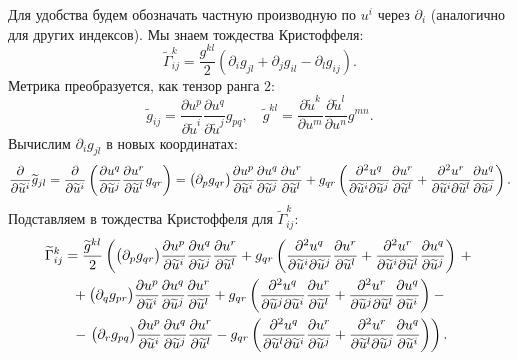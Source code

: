 \begin{solution}
	Для удобства будем обозначать частную производную по $u^i$ через $\partial_i$ (аналогично для других индексов). Мы знаем тождества Кристоффеля:
	\[
		\widetilde{\Gamma}_{ij}^k = \frac{g^{kl}}{2}(\partial_ig_{jl} + \partial_jg_{il} - \partial_lg_{ij}).
	\]
	Метрика преобразуется, как тензор ранга $2$:
	\[
		\widetilde{g}_{ij} = \frac{\partial u^p}{\partial \widetilde{u}^i}\frac{\partial u^q}{\partial \widetilde{u}^j}g_{pq},\quad \widetilde{g}^{kl} = \frac{\partial \widetilde{u}^k}{\partial u^m}\frac{\partial \widetilde{u}^l}{\partial u^n}g^{mn}.
	\]
	Вычислим $\partial_ig_{jl}$ в новых координатах:
	\[
		\frac{\partial}{\partial \widetilde{u}^i}\widetilde{g}_{jl} = \frac{\partial}{\partial \widetilde{u}^i}\left(\frac{\partial u^q}{\partial \widetilde{u}^j}\frac{\partial u^r}{\partial \widetilde{u}^l}g_{qr}\right) = \big(\partial_pg_{qr}\big)\frac{\partial u^p}{\partial \widetilde{u}^i}\frac{\partial u^q}{\partial \widetilde{u}^j}\frac{\partial u^r}{\partial \widetilde{u}^l} + g_{qr}\left(\frac{\partial^2u^q}{\partial\widetilde{u}^i\partial\widetilde{u}^j}\frac{\partial u^r}{\partial\widetilde{u}^l} + \frac{\partial^2u^r}{\partial\widetilde{u}^i\partial\widetilde{u}^l}\frac{\partial u^q}{\partial\widetilde{u}^j}\right).
	\]
	Подставляем в тождества Кристоффеля для $\widetilde{\Gamma}_{ij}^k$:
	\begin{gather*}
		\widetilde{\Gamma}_{ij}^k = \frac{\widetilde{g}^{kl}}{2}\left(
		\big(\partial_pg_{qr}\big)\frac{\partial u^p}{\partial \widetilde{u}^i}\frac{\partial u^q}{\partial \widetilde{u}^j}\frac{\partial u^r}{\partial \widetilde{u}^l} + g_{qr}\br{\frac{\partial^2u^q}{\partial\widetilde{u}^i\partial\widetilde{u}^j}\frac{\partial u^r}{\partial\widetilde{u}^l} + \frac{\partial^2u^r}{\partial\widetilde{u}^i\partial\widetilde{u}^l}\frac{\partial u^q}{\partial\widetilde{u}^j}}\right. + {}\\
		{} + \big(\partial_qg_{pr}\big)\frac{\partial u^p}{\partial \widetilde{u}^i}\frac{\partial u^q}{\partial \widetilde{u}^j}\frac{\partial u^r}{\partial \widetilde{u}^l} + g_{qr}\br{\frac{\partial^2u^q}{\partial\widetilde{u}^j\partial\widetilde{u}^i}\frac{\partial u^r}{\partial\widetilde{u}^l} + \frac{\partial^2u^r}{\partial\widetilde{u}^j\partial\widetilde{u}^l}\frac{\partial u^q}{\partial\widetilde{u}^i}} - {}\\
		{} - \left.\big(\partial_rg_{pq}\big)\frac{\partial u^p}{\partial \widetilde{u}^i}\frac{\partial u^q}{\partial \widetilde{u}^j}\frac{\partial u^r}{\partial \widetilde{u}^l} - g_{qr}\br{\frac{\partial^2u^q}{\partial\widetilde{u}^l\partial\widetilde{u}^i}\frac{\partial u^r}{\partial\widetilde{u}^j} + \frac{\partial^2u^r}{\partial\widetilde{u}^l\partial\widetilde{u}^j}\frac{\partial u^q}{\partial\widetilde{u}^i}}\right).

\end{gather*}
\end{solution}

